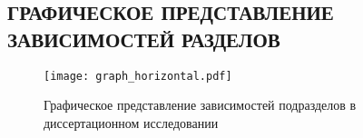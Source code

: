 \begin{landscape}
\chapter{ГРАФИЧЕСКОЕ ПРЕДСТАВЛЕНИЕ ЗАВИСИМОСТЕЙ РАЗДЕЛОВ}
\label{AppС}
\begin{figure}[H]
\begin{center}
\texttt{[image: graph\_horizontal.pdf]}
\caption{Графическое представление зависимостей подразделов в диссертационном исследовании}
\label{fig:graph_horizontal.pdf}
\end{center}
\end{figure}
\end{landscape}